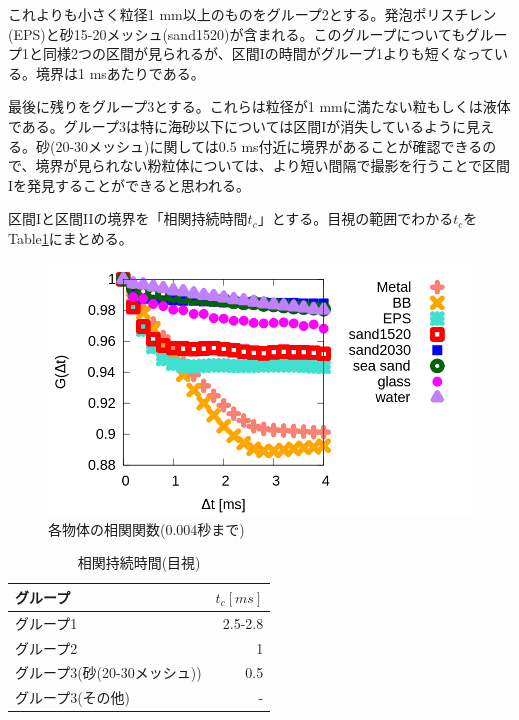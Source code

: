 \documentclass[a4paper,12pt,dvipdfmx]{jsarticle}
\newcommand{\II}{I\hspace{-.1em}I}
\begin{document}
これよりも小さく粒径1 mm以上のものをグループ2とする。発泡ポリスチレン(EPS)と砂15-20メッシュ(sand1520)が含まれる。このグループについてもグループ1と同様2つの区間が見られるが、区間Iの時間がグループ1よりも短くなっている。境界は1 msあたりである。 \par
最後に残りをグループ3とする。これらは粒径が1 mmに満たない粒もしくは液体である。グループ3は特に海砂以下については区間Iが消失しているように見える。砂(20-30メッシュ)に関しては0.5 ms付近に境界があることが確認できるので、境界が見られない粉粒体については、より短い間隔で撮影を行うことで区間Iを発見することができると思われる。\par
区間Iと区間\II の境界を「相関持続時間$t_c$」とする。目視の範囲でわかる$t_c$をTable\ref{tb:tc_eye}にまとめる。
\begin{figure}[H]
	\includegraphics[scale=0.4]{init.png}
	\caption{各物体の相関関数(0.004秒まで)}
	\label{fig:init}
\end{figure}

\begin{table}[H]
	\caption{相関持続時間(目視) \label{tb:tc_eye}}
	\begin{tabular}{lr}
		\toprule
		グループ & $t_c [ms]$ \\
		\midrule
		グループ1 & 2.5-2.8 \\
		グループ2 & 1 \\
		グループ3(砂(20-30メッシュ)) & 0.5 \\
		グループ3(その他) & - \\
		\bottomrule
	\end{tabular}
\end{table}
\end{document}
